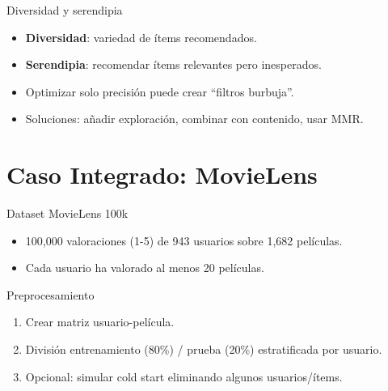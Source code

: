 \documentclass[aspectratio=169, 10pt, xcolor=table]{beamer}
\begin{document}
\begin{frame}{Diversidad y serendipia}
    \begin{itemize}
        \item \textbf{Diversidad}: variedad de ítems recomendados.
        \item \textbf{Serendipia}: recomendar ítems relevantes pero inesperados.
        \item Optimizar solo precisión puede crear ``filtros burbuja''.
        \item Soluciones: añadir exploración, combinar con contenido, usar MMR.
    \end{itemize}
\end{frame}

\section{Caso Integrado: MovieLens}

\begin{frame}{Dataset MovieLens 100k}
    \begin{itemize}
        \item 100,000 valoraciones (1-5) de 943 usuarios sobre 1,682 películas.
        \item Cada usuario ha valorado al menos 20 películas.
    \end{itemize}
    \begin{block}{Preprocesamiento}
        \begin{enumerate}
            \item Crear matriz usuario-película.
            \item División entrenamiento (80\%) / prueba (20\%) estratificada por usuario.
            \item Opcional: simular cold start eliminando algunos usuarios/ítems.
        \end{enumerate}
    \end{block}
\end{frame}
\end{document}
